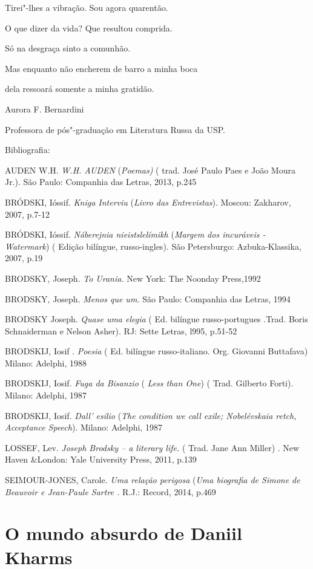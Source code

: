 Tirei"-lhes a vibração. Sou agora quarentão.

O que dizer da vida? Que resultou comprida.

Só na desgraça sinto a comunhão.

Mas enquanto não encherem de barro a minha boca

dela ressoará somente a minha gratidão.

Aurora F. Bernardini

Professora de pós"-graduação em Literatura Russa da USP.

Bibliografia:

AUDEN W.H. \emph{W.H. AUDEN} (\emph{Poemas)} ( trad. José Paulo Paes e
João Moura Jr.). São Paulo: Companhia das Letras, 2013, p.245

BRÓDSKI, Ióssif. \emph{Kniga Interviu} (\emph{Livro das Entrevistas}).
Moscou: Zakharov, 2007, p.7-12

BRÓDSKI, Ióssif. \emph{Náberejnia nieistslelímikh} (\emph{Margem dos
incuráveis - Watermark}) ( Edição bilíngue, russo-ingles). São
Petersburgo: Azbuka-Klassika, 2007, p.19

BRODSKY, Joseph. \emph{To Urania.} New York: The Noonday Press,1992

BRODSKY, Joseph. \emph{Menos que um.} São Paulo: Companhia das Letras,
1994

BRODSKY Joseph. \emph{Quase uma elegia} ( Ed. bilíngue russo-portugues
.Trad. Boris Schnaiderman e Nelson Asher). RJ: Sette Letras, l995,
p.51-52

BRODSKIJ, Iosif . \emph{Poesia} ( Ed. bilíngue russo-italiano. Org.
Giovanni Buttafava) Milano: Adelphi, 1988

BRODSKIJ, Iosif. \emph{Fuga da Bisanzio} ( \emph{Less than One}) ( Trad.
Gilberto Forti). Milano: Adelphi, 1987

BRODSKIJ, Iosif. \emph{Dall' esilio} (\emph{The condition we call exile;
Nobelévskaia retch, Acceptance Speech}). Milano: Adelphi, 1987

LOSSEF, Lev. \emph{Joseph Brodsky -- a literary life.} ( Trad. Jane Ann
Miller) . New Haven \&London: Yale University Press, 2011, p.139

SEIMOUR-JONES, Carole. \emph{Uma relação perigosa} (\emph{Uma biografia
de Simone de Beauvoir e Jean-Paule Sartre .} R.J.: Record, 2014, p.469

\chapter{O mundo absurdo de Daniil Kharms}

